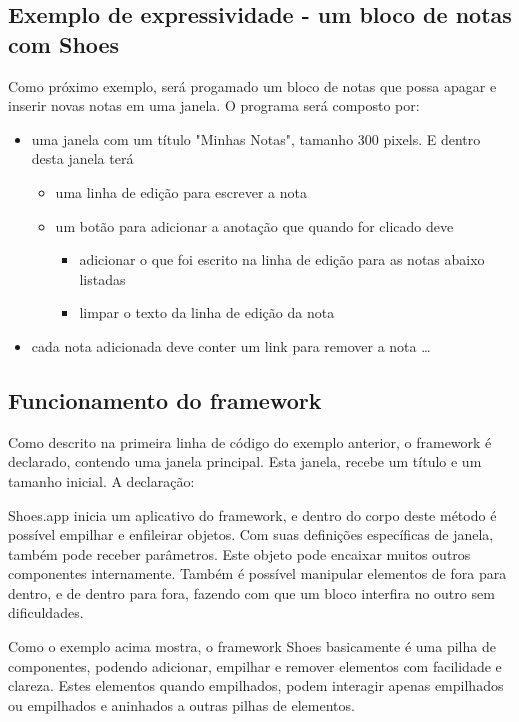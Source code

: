 \documentclass[espaco=simples,appendix=Name]{abnt}
\begin{document}

\subsection{ Exemplo de expressividade - um bloco de notas com Shoes }

Como próximo exemplo, será progamado um bloco de notas que possa apagar e inserir novas notas em uma janela. O programa será composto por:
\begin{itemize} 
  \item uma janela com um título "Minhas Notas", tamanho 300 pixels. E dentro desta janela terá 
  \begin{itemize} 
    \item uma linha de edição para escrever a nota
    \item um botão para adicionar a anotação que quando for clicado deve 
    \begin{itemize} 
      \item adicionar o que foi escrito na linha de edição para as notas abaixo listadas
      \item limpar o texto da linha de edição da nota
    \end{itemize} 
  \end{itemize} 
  \item cada nota adicionada deve conter um link para remover a nota \ldots
\end{itemize} 


\subsection { Funcionamento do framework }

Como descrito na primeira linha de código do exemplo anterior, o framework é declarado, contendo uma janela principal. Esta janela, recebe um título e um tamanho inicial.
A declaração:

 

Shoes.app inicia um aplicativo do framework, e dentro do corpo deste método é possível empilhar e enfileirar objetos. Com suas definições específicas de janela, também pode receber parâmetros. Este objeto pode encaixar muitos outros componentes internamente. Também é possível manipular elementos de fora para dentro, e de dentro para fora, fazendo com que um bloco interfira no outro sem dificuldades.

Como o exemplo acima mostra, o framework Shoes basicamente é uma pilha de componentes, podendo adicionar, empilhar e remover elementos com facilidade e clareza. Estes elementos quando empilhados, podem interagir apenas empilhados ou empilhados e aninhados a outras pilhas de elementos. 
\end{document}
